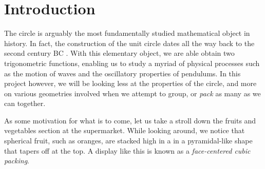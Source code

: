 \chapter{Introduction}

\begin{flushleft}
The circle is arguably the most fundamentally studied mathematical object in history. In fact, the construction of the unit circle dates all the way back to the second century BC \cite{unit_circle}. With this elementary object, we are able obtain two trigonometric functions, enabling us to study a myriad of physical processes such as the motion of waves and the oscillatory properties of pendulums. In this project however, we will be looking less at the properties of the circle, and more on various geometries involved when we attempt to group, or \textit{pack} as many as we can together. 
\end{flushleft}

\begin{flushleft}
As some motivation for what is to come, let us take a stroll down the fruits and vegetables section at the supermarket. While looking around, we notice that spherical fruit, such as oranges, are stacked high in a in a pyramidal-like shape that tapers off at the top. A display like this is known as a \textit{face-centered cubic packing}.
\end{flushleft}

